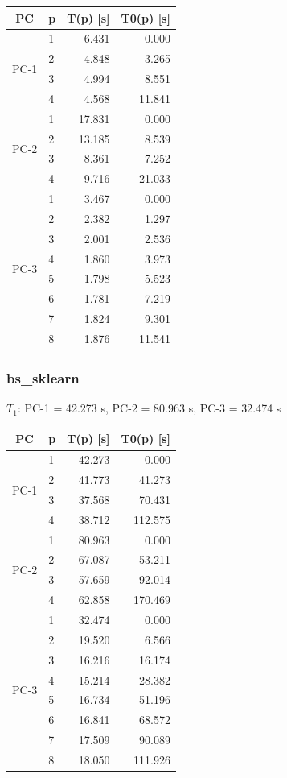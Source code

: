 \documentclass[11pt]{article}
\begin{document}
\begin{center}
\begin{tabular}{clrr}
\toprule
PC & p & T(p) [s] & T0(p) [s] \\
\midrule
\multirow{4}{*}{PC-1} & 1 & 6.431 & 0.000 \\
 & 2 & 4.848 & 3.265 \\
 & 3 & 4.994 & 8.551 \\
 & 4 & 4.568 & 11.841 \\
\midrule
\multirow{4}{*}{PC-2} & 1 & 17.831 & 0.000 \\
 & 2 & 13.185 & 8.539 \\
 & 3 & 8.361 & 7.252 \\
 & 4 & 9.716 & 21.033 \\
\midrule
\multirow{8}{*}{PC-3} & 1 & 3.467 & 0.000 \\
 & 2 & 2.382 & 1.297 \\
 & 3 & 2.001 & 2.536 \\
 & 4 & 1.860 & 3.973 \\
 & 5 & 1.798 & 5.523 \\
 & 6 & 1.781 & 7.219 \\
 & 7 & 1.824 & 9.301 \\
 & 8 & 1.876 & 11.541 \\
\bottomrule
\end{tabular}
\end{center}

\subsubsection*{bs\_sklearn}

$T_1$: PC-1 = 42.273 s, PC-2 = 80.963 s, PC-3 = 32.474 s

\begin{center}
\begin{tabular}{clrr}
\toprule
PC & p & T(p) [s] & T0(p) [s] \\
\midrule
\multirow{4}{*}{PC-1} & 1 & 42.273 & 0.000 \\
 & 2 & 41.773 & 41.273 \\
 & 3 & 37.568 & 70.431 \\
 & 4 & 38.712 & 112.575 \\
\midrule
\multirow{4}{*}{PC-2} & 1 & 80.963 & 0.000 \\
 & 2 & 67.087 & 53.211 \\
 & 3 & 57.659 & 92.014 \\
 & 4 & 62.858 & 170.469 \\
\midrule
\multirow{8}{*}{PC-3} & 1 & 32.474 & 0.000 \\
 & 2 & 19.520 & 6.566 \\
 & 3 & 16.216 & 16.174 \\
 & 4 & 15.214 & 28.382 \\
 & 5 & 16.734 & 51.196 \\
 & 6 & 16.841 & 68.572 \\
 & 7 & 17.509 & 90.089 \\
 & 8 & 18.050 & 111.926 \\
\bottomrule
\end{tabular}
\end{center}
\end{document}
